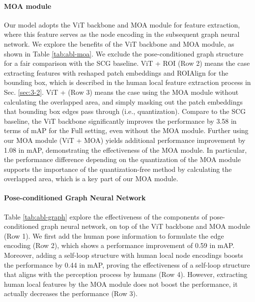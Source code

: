 \documentclass[10pt,twocolumn,letterpaper]{article}
\begin{document}
\paragraph{MOA module} Our model adopts the ViT backbone and MOA module for feature extraction, where this feature serves as the node encoding in the subsequent graph neural network. We explore the benefits of the ViT backbone and MOA module, as shown in Table \ref{tab:abl-moa}. We exclude the pose-conditioned graph structure for a fair comparison with the SCG baseline. ViT + ROI (Row 2) means the case extracting features with reshaped patch embeddings and ROIAlign for the bounding box, which is described in the human local feature extraction process in Sec. \ref{sec:3-2}. ViT +  (Row 3) means the case using the MOA module without calculating the overlapped area, and simply masking out the patch embeddings that bounding box edges pass through (i.e., quantization). Compare to the SCG baseline, the ViT backbone significantly improves the performance by 3.58 in terms of mAP for the Full setting, even without the MOA module. Further using our MOA module (ViT + MOA) yields additional performance improvement by 1.08 in mAP, demonstrating the effectiveness of the MOA module. In particular, the performance difference depending on the quantization of the MOA module supports the importance of the quantization-free method by calculating the overlapped area, which is a key part of our MOA module.

\paragraph{Pose-conditioned Graph Neural Network}
Table \ref{tab:abl-graph} explore the effectiveness of the components of pose-conditioned graph neural network, on top of the ViT backbone and MOA module (Row 1). We first add the human pose information to formulate the edge encoding (Row 2), which shows a performance improvement of 0.59 in mAP. Moreover, adding a self-loop structure with human local node encodings boosts the performance by 0.44 in mAP, proving the effectiveness of a self-loop structure that aligns with the perception process by humans (Row 4). However, extracting human local features by the MOA module does not boost the performance, it actually decreases the performance (Row 3). 
\end{document}
